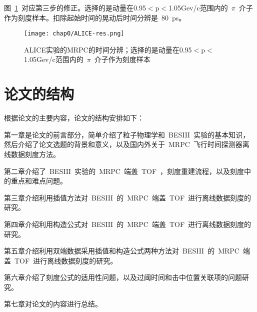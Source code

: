 图~\ref{fig:ALICE-res}~对应第三步的修正。选择的是动量在0.95$<$p$<$1.05Gev/c范围内的~$\pi$~介子作为刻度样本。扣除起始时间的晃动后时间分辨是~80~ps。
\begin{figure}[!h]
  \centering
  \texttt{[image: chap0/ALICE-res.png]}
  \caption{ALICE实验的MRPC的时间分辨；选择的是动量在0.95$<$p$<$1.05Gev/c范围内的~$\pi$~介子作为刻度样本}
  \label{fig:ALICE-res}
\end{figure}

\section{论文的结构}
根据论文的主要内容，论文的结构安排如下：

第一章是论文的前言部分，简单介绍了粒子物理学和~BESIII~实验的基本知识，然后介绍了论文选题的背景和意义，以及国内外关于~MRPC~飞行时间探测器离线数据刻度方法。

第二章介绍了~BESIII~实验的~MRPC~端盖~TOF~，刻度重建流程，以及刻度中的重点和难点问题。

第三章介绍利用插值方法对~BESIII~的~MRPC~端盖~TOF~进行离线数据刻度的研究。

第四章介绍利用构造公式对~BESIII~的~MRPC~端盖~TOF~进行离线数据刻度的研究。

第五章介绍利用双端数据采用插值和构造公式两种方法对~BESIII~的~MRPC~端盖~TOF~进行离线数据刻度的研究。

第六章介绍了刻度公式的适用性问题，以及过阈时间和击中位置关联项的问题研究。

第七章对论文的内容进行总结。












